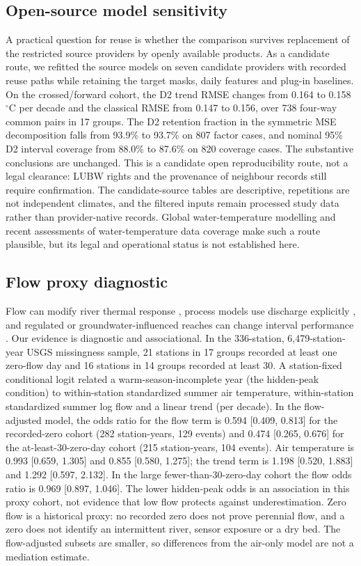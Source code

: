 \subsection{Open-source model sensitivity}
A practical question for reuse is whether the comparison survives replacement of the restricted source providers by openly available products. As a candidate route, we refitted the source models on seven candidate providers with recorded reuse paths while retaining the target masks, daily features and plug-in baselines. On the crossed/forward cohort, the D2 trend RMSE changes from 0.164 to 0.158 $^{\circ}$C per decade and the classical RMSE from 0.147 to 0.156, over 738 four-way common pairs in 17 groups. The D2 retention fraction in the symmetric MSE decomposition falls from 93.9\% to 93.7\% on 807 factor cases, and nominal 95\% D2 interval coverage from 88.0\% to 87.6\% on 820 coverage cases. The substantive conclusions are unchanged. This is a candidate open reproducibility route, not a legal clearance: LUBW rights and the provenance of neighbour records still require confirmation. The candidate-source tables are descriptive, repetitions are not independent climates, and the filtered inputs remain processed study data rather than provider-native records. Global water-temperature modelling \citep{vanvliet2011} and recent assessments of water-temperature data coverage \citep{diaz2025} make such a route plausible, but its legal and operational status is not established here.

\subsection{Flow proxy diagnostic}
Flow can modify river thermal response \citep{vanvliet2011}, process models use discharge explicitly \citep{toffolon2015}, and regulated or groundwater-influenced reaches can change interval performance \citep{diaz2025}. Our evidence is diagnostic and associational. In the 336-station, 6,479-station-year USGS missingness sample, 21 stations in 17 groups recorded at least one zero-flow day and 16 stations in 14 groups recorded at least 30. A station-fixed conditional logit related a warm-season-incomplete year (the hidden-peak condition) to within-station standardized summer air temperature, within-station standardized summer log flow and a linear trend (per decade). In the flow-adjusted model, the odds ratio for the flow term is 0.594 [0.409, 0.813] for the recorded-zero cohort (282 station-years, 129 events) and 0.474 [0.265, 0.676] for the at-least-30-zero-day cohort (215 station-years, 104 events). Air temperature is 0.993 [0.659, 1.305] and 0.855 [0.580, 1.275]; the trend term is 1.198 [0.520, 1.883] and 1.292 [0.597, 2.132]. In the large fewer-than-30-zero-day cohort the flow odds ratio is 0.969 [0.897, 1.046]. The lower hidden-peak odds is an association in this proxy cohort, not evidence that low flow protects against underestimation. Zero flow is a historical proxy: no recorded zero does not prove perennial flow, and a zero does not identify an intermittent river, sensor exposure or a dry bed. The flow-adjusted subsets are smaller, so differences from the air-only model are not a mediation estimate.

